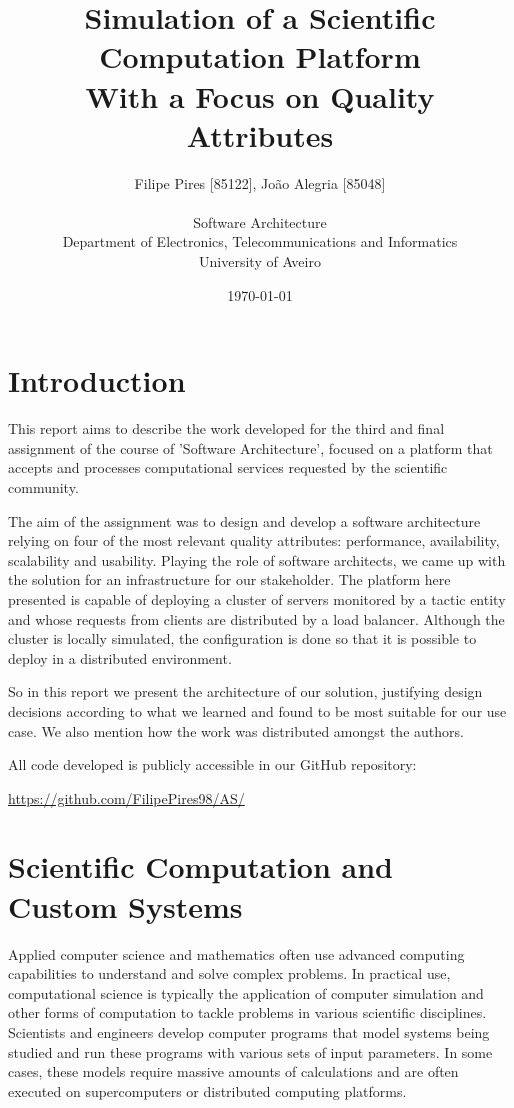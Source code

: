 \documentclass[12pt]{article}
\title{Simulation of a Scientific Computation Platform\\With a Focus on Quality Attributes}
\author
{Filipe Pires [85122], João Alegria [85048]\\
  \\
  Software Architecture\\
  \normalsize{Department of Electronics, Telecommunications and Informatics}\\
  \normalsize{University of Aveiro}\\
}
\date{\today{}}
\begin{document}
\baselineskip18pt

\maketitle

\section*{Introduction} %

This report aims to describe the work developed for the third and final assignment of the course of 'Software Architecture', focused on a platform that accepts
and processes computational services requested by the scientific community.

The aim of the assignment was to design and develop a software architecture relying on four of the most relevant quality attributes:
performance, availability, scalability and usability.
Playing the role of software architects, we came up with the solution for an infrastructure for our stakeholder.
The platform here presented is capable of deploying a cluster of servers monitored by a tactic entity and whose requests from clients are distributed by a load balancer.
Although the cluster is locally simulated, the configuration is done so that it is possible to deploy in a distributed environment.

So in this report we present the architecture of our solution, justifying design decisions according to what we learned and found to be most suitable for our use case.
We also mention how the work was distributed amongst the authors.

All code developed is publicly accessible in our GitHub repository:

\url{https://github.com/FilipePires98/AS/}

\newpage
\section{Scientific Computation and Custom Systems} \label{scientificcomputation} %

Applied computer science and mathematics often use advanced computing capabilities to understand and solve complex problems.
In practical use, computational science is typically the application of computer simulation and other forms of computation to tackle problems in various
scientific disciplines.
Scientists and engineers develop computer programs that model systems being studied and run these programs with various sets of input parameters.
In some cases, these models require massive amounts of calculations and are often executed on supercomputers or distributed computing platforms.
\end{document}
